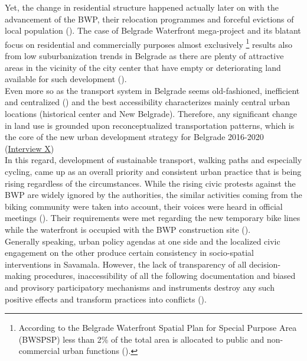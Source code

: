 \documentclass[11pt]{report}
\begin{document}
Yet, the change in residential structure happened actually later on with the advancement of the BWP, their relocation programmes and forceful evictions of local population (\cite{ref media}).
The case of Belgrade Waterfront mega-project and its blatant focus on residential and commercially purposes almost exclusively
\footnote{According to the Belgrade Waterfront Spatial Plan for Special Purpose Area (BWSPSP) less than 2\% of the total area is allocated to public and non-commercial urban functions (\cite{BWPSPSP}).} %
results also from low suburbanization trends in Belgrade as there are plenty of attractive areas in the vicinity of the city center that have empty or deteriorating land available for such development (\citealt{hirt_belgrade_2009}).
\\

Even more so as the transport system in Belgrade seems old-fashioned, inefficient and centralized (\citealt{grozdanic_belgrade_2008}) and the best accessibility characterizes mainly central urban locations (historical center and New Belgrade).
Therefore, any significant change in land use is grounded upon reconceptualized transportation patterns, which is the core of the new urban development strategy for Belgrade 2016-2020 (\href{InterviewX}{Interview X})
\\

In this regard, development of sustainable transport, walking paths and especially cycling, came up as an overall priority and consistent urban practice that is being rising regardless of the circumstances.
While the rising civic protests against the BWP are widely ignored by the authorities, the similar activities coming from the biking community were taken into account, their voices were heard in official meetings (\cite{media}).
Their requirements were met regarding the new temporary bike lines while the waterfront is occupied with the BWP construction site (\cite{media}).
\\

Generally speaking, urban policy agendas at one side and the localized civic engagement on the other produce certain consistency in socio-spatial interventions in Savamala.
However, the lack of transparency of all decision-making procedures, inaccessibility of all the following documentation and biased and provisory participatory mechanisms and instruments destroy any such positive effects and transform practices into conflicts (\cite{MinistarstvoProstora2014}).
\end{document}
